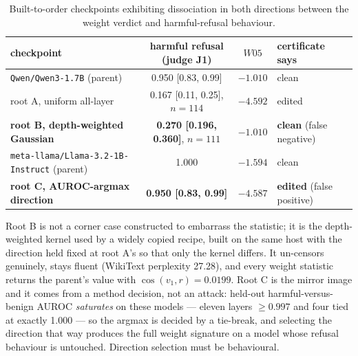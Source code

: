 \documentclass[11pt,letterpaper]{article}
\begin{document}
\begin{table}[!htbp]
\centering
\caption{Built-to-order checkpoints exhibiting dissociation in both directions between the weight verdict and harmful-refusal behaviour.}
\label{tab:dissoc}
\footnotesize
\setlength{\tabcolsep}{4pt}
\begin{tabular}{lccl}
\toprule
checkpoint & harmful refusal (judge J1) & $W05$ & certificate says \\
\midrule
\texttt{Qwen/Qwen3-1.7B} (parent) & 0.950 [0.83, 0.99] & $-1.010$ & clean \\
root A, uniform all-layer & 0.167 [0.11, 0.25], $n{=}114$ & $-4.592$ & edited \\
\textbf{root B, depth-weighted Gaussian} & \textbf{0.270 [0.196, 0.360]}, $n{=}111$ & $\mathbf{-1.010}$ & \textbf{clean} (false negative) \\
\texttt{meta-llama/Llama-3.2-1B-Instruct} (parent) & 1.000 & $-1.594$ & clean \\
\textbf{root C, AUROC-argmax direction} & \textbf{0.950 [0.83, 0.99]} & $\mathbf{-4.587}$ & \textbf{edited} (false positive) \\
\bottomrule
\end{tabular}
\end{table}

Root B is not a corner case constructed to embarrass the statistic; it is the depth-weighted kernel used by a widely copied recipe, built on the same host with the direction held fixed at root A's so that only the kernel differs. It un-censors genuinely, stays fluent (WikiText perplexity 27.28), and every weight statistic returns the parent's value with $\cos(v_1,r) = 0.0199$. Root C is the mirror image and it comes from a method decision, not an attack: held-out harmful-versus-benign AUROC \emph{saturates} on these models --- eleven layers $\geq 0.997$ and four tied at exactly 1.000 --- so the argmax is decided by a tie-break, and selecting the direction that way produces the full weight signature on a model whose refusal behaviour is untouched. Direction selection must be behavioural.
\end{document}
